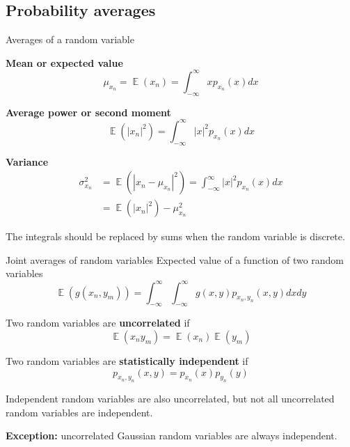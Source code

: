 \documentclass[10pt]{beamer}
\DeclareMathOperator{\E}{\mathbb{E}} %
\begin{document}
\subsection{Probability averages}
\begin{frame}{Averages of a random variable}

\textbf{Mean or expected value}
\begin{equation*}
	\mu_{x_n} = \E(x_n) = \int_{-\infty}^{\infty}xp_{x_n}(x)dx
\end{equation*}

\pause
\textbf{Average power or second moment}
\begin{equation*} 
	\E(|x_n|^2) = \int_{-\infty}^{\infty}|x|^2p_{x_n}(x)dx
\end{equation*}

\pause
\textbf{Variance}
\begin{align*}
\sigma^2_{x_n} &= \E(|x_n-\mu_{x_n}|^2) = \int_{-\infty}^{\infty}|x|^2p_{x_n}(x)dx \\
&= \E(|x_n|^2) - \mu_{x_n}^2
\end{align*}

The integrals should be replaced by sums when the random variable is discrete.

\end{frame}

\begin{frame}{Joint averages of random variables}
Expected value of a function of two random variables
\begin{equation*}
\E(g(x_n,y_m)) = \int_{-\infty}^{\infty}\int_{-\infty}^{\infty}g(x, y)p_{x_n, y_n}(x, y)dxdy
\end{equation*}

\pause
Two random variables are \textbf{uncorrelated} if
\begin{equation*}
\E(x_ny_m) = \E(x_n)\E(y_m)
\end{equation*}

\pause
Two random variables are \textbf{statistically independent} if
\begin{equation*}
p_{x_n, y_n}(x,y) = p_{x_n}(x)p_{y_n}(y)
\end{equation*}

Independent random variables are also uncorrelated, but not all uncorrelated random variables are independent.

\textbf{Exception:} uncorrelated Gaussian random variables are always independent.
\end{frame}
\end{document}
